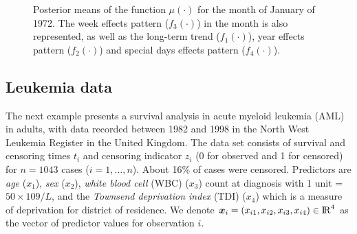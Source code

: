 \documentclass[onecolumn,a4paper,11pt]{article}
\begin{document}
\begin{figure}
\centering
{}
\caption{Posterior means of the function $\mu(\cdot)$ for the month of January of 1972. The week effects pattern ($f_3(\cdot)$) in the month is also represented, as well as the long-term trend ($f_1(\cdot)$), year effects pattern ($f_2(\cdot)$) and special days effects pattern ($f_4(\cdot)$). }
  \label{ch5_fig27_posteriors_onemonth_birthday}
\end{figure}

 
\subsection{Leukemia data}\label{ch5_sec_bf_caseVI}

The next example presents a survival analysis in acute myeloid leukemia (AML) in adults, with data recorded between 1982 and 1998 in the North West Leukemia Register in the United Kingdom. The data set consists of survival and censoring times $t_i$ and censoring indicator $z_i$ (0 for observed and 1 for censored) for $n=1043$ cases ($i=1,\dots,n$). About 16\% of cases were censored. Predictors are \textit{age} ($x_1$), \textit{sex} ($x_2$), \textit{white blood cell} (WBC) ($x_3$) count at diagnosis with 1 unit = $50\times109/L$, and the \textit{Townsend deprivation index} (TDI) ($x_4$) which is a measure of deprivation for district of residence. We denote $\bm{x}_i=(x_{i1},x_{i2},x_{i3},x_{i4}) \in {\rm I\!R}^{4}$ as the vector of predictor values for observation $i$.

\end{document}
